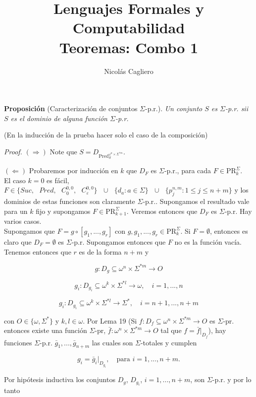 \documentclass{article}
\title{Lenguajes Formales y Computabilidad \\
        \large Teoremas: Combo 1 }
\author{Nicolás Cagliero}
\begin{document}
\maketitle

\textbf{Proposición} (Caracterización de conjuntos $\Sigma$-p.r.). \textit{Un conjunto $S$ es $\Sigma$-p.r. sii $S$ es el dominio de alguna función $\Sigma$-p.r.}
\medskip

(En la inducción de la prueba hacer solo el caso de la composición)
\medskip

\textit{Proof.} $(\Rightarrow)$ Note que $S = D_{\text{Pred}_{S}^{\omega^n \times \Sigma^{*m}}}$.

$(\Leftarrow)$ Probaremos por inducción en $k$ que $D_F$ es $\Sigma$-p.r., para cada $F \in \text{PR}^{\Sigma}_{k}$.\\

El caso $k = 0$ es fácil, $F \in \{Suc, \text{ } Pred, \text{ } C_0^{0,0}, \text{ } C_{\varepsilon}^{0,0}\} \text{ } \cup \text{ } \{d_a : a \in \Sigma\} \text{ } \cup \text{ } \{p_j^{n,m} : 1 \leq j \leq n + m\}$ y los dominios de estas funciones son claramente $\Sigma$-p.r.. Supongamos el resultado vale para un $k$ fijo y supongamos $F \in \text{PR}^{\Sigma}_{k+1}$. Veremos entonces que $D_F$ es $\Sigma$-p.r. Hay varios casos.\\

Supongamos que $F = g \circ [g_1, ..., g_r]$ con $g, g_1, ..., g_r \in \text{PR}^{\Sigma}_k$. Si $F = \emptyset$, entonces es claro que $D_F = \emptyset$ es $\Sigma$-p.r. Supongamos entonces que $F$ no es la función vacía. Tenemos entonces que $r$ es de la forma $n + m$ y

\[
g : D_g \subseteq \omega^n \times \Sigma^{*m} \to O
\]

\[
g_i : D_{g_i} \subseteq \omega^k \times \Sigma^{*l} \to \omega, \quad i = 1, ..., n
\]

\[
g_i : D_{g_i} \subseteq \omega^k \times \Sigma^{*l} \to \Sigma^*, \quad i = n + 1, ..., n + m
\]

con $O \in \{\omega, \Sigma^*\}$ y $k, l \in \omega$. Por Lema 19 (Si $f : D_f \subseteq \omega^n \times \Sigma^{*m} \to O$ es $\Sigma$-pr. entonces existe una función $\Sigma$-pr, $\bar{f} : \omega^n \times \Sigma^{*m} \to O$ tal que $f = \bar{f}|_{D_f}$), hay funciones $\Sigma$-p.r. $\bar{g}_1, ..., \bar{g}_{n+m}$ las cuales son $\Sigma$-totales y cumplen

\[
g_i = \bar{g}_i|_{D_{g_i}}, \quad \text{para } i = 1, ..., n + m.
\]

Por hipótesis inductiva los conjuntos $D_g$, $D_{g_i}$, $i = 1, ..., n+m$, son $\Sigma$-p.r. y por lo tanto
\end{document}
